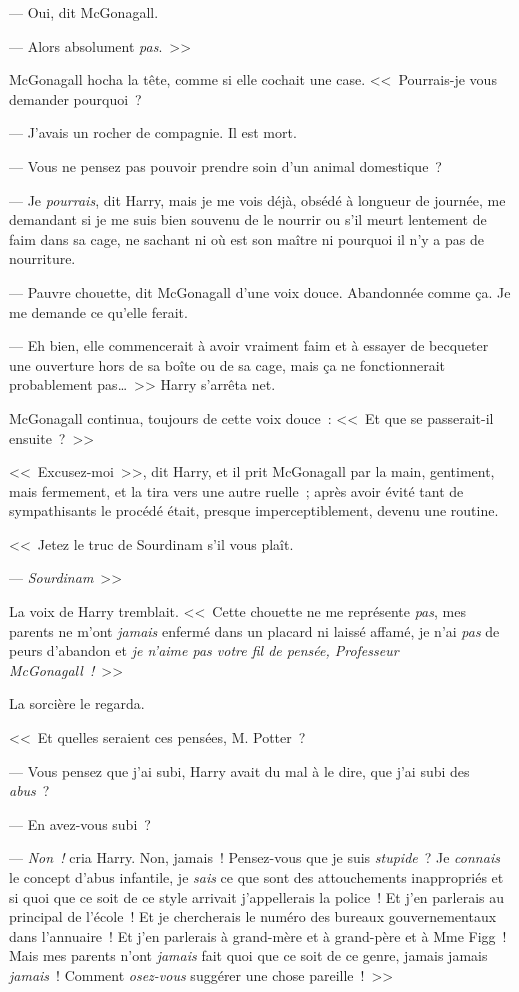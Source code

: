 --- Oui, dit McGonagall.

--- Alors absolument \emph{pas}.~>>

McGonagall hocha la tête, comme si elle cochait une case.
<<~Pourrais-je vous demander pourquoi~?

--- J'avais un rocher de compagnie. Il est mort.

--- Vous ne pensez pas pouvoir prendre soin d'un animal domestique~?

--- Je \emph{pourrais}, dit Harry, mais je me vois déjà, obsédé à longueur de journée, me demandant si je me suis bien souvenu de le nourrir ou s'il meurt lentement de faim dans sa cage, ne sachant ni où est son maître ni pourquoi il n'y a pas de nourriture.

--- Pauvre chouette, dit McGonagall d'une voix douce. Abandonnée comme ça. Je me demande ce qu'elle ferait.

--- Eh bien, elle commencerait à avoir vraiment faim et à essayer de becqueter une ouverture hors de sa boîte ou de sa cage, mais ça ne fonctionnerait probablement pas…~>> Harry s'arrêta net.

McGonagall continua, toujours de cette voix douce~: <<~Et que se passerait-il ensuite~?~>>

<<~Excusez-moi~>>, dit Harry, et il prit McGonagall par la main, gentiment, mais fermement, et la tira vers une autre ruelle~; après avoir évité tant de sympathisants le procédé était, presque imperceptiblement, devenu une routine.

<<~Jetez le truc de Sourdinam s'il vous plaît.

--- \emph{Sourdinam}~>>

La voix de Harry tremblait. <<~Cette chouette ne me représente \emph{pas}, mes parents ne m'ont \emph{jamais} enfermé dans un placard ni laissé affamé, je n'ai \emph{pas} de peurs d'abandon et \emph{je n'aime pas votre fil de pensée, Professeur McGonagall~!}~>>

La sorcière le regarda.

<<~Et quelles seraient ces pensées, M. Potter~?

--- Vous pensez que j'ai subi, Harry avait du mal à le dire, que j'ai subi des \emph{abus}~?

--- En avez-vous subi~?

--- \emph{Non~!} cria Harry. Non, jamais~! Pensez-vous que je suis \emph{stupide}~? Je \emph{connais} le concept d'abus infantile, je \emph{sais} ce que sont des attouchements inappropriés et si quoi que ce soit de ce style arrivait j'appellerais la police~! Et j'en parlerais au principal de l'école~! Et je chercherais le numéro des bureaux gouvernementaux dans l'annuaire~! Et j'en parlerais à grand-mère et à grand-père et à Mme Figg~! Mais mes parents n'ont \emph{jamais} fait quoi que ce soit de ce genre, jamais jamais \emph{jamais}~! Comment \emph{osez-vous} suggérer une chose pareille~!~>>

